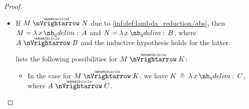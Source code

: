 \begin{proof}
\begin{itemize}
\begin{itemize}
\begin{itemize}
\begin{itemize}
          Let \( L \coloneqq Q[x \mapsto R] \). Since \( D \ppred R \), by \ref{inf:def:parallel_reduction/beta} we have
          \begin{equation*}
            N = CD \aequiv (\qabs x H) D \ppred Q[x \mapsto R] = L
          \end{equation*}
          and, since \( G \ppred R \), by  we have
          \begin{equation*}
            K \aequiv F[x \mapsto G] \ppred Q[x \mapsto R] = L.
          \end{equation*}

          So \( L \) is the desired confluence point of \( N \) and \( K \).

          \item In the case , which requires the \( \eta \)-reduction rule \ref{inf:def:parallel_reduction/eta}, \( x \) is not free in \( P \) and \( F \aequiv Px \).

          Let \( L \coloneqq PR \). Then
          \begin{equation*}
            N
            =
            CD
            \ppred
            PR
            =
            L
          \end{equation*}
          and
          \begin{equation*}
            K
            \aequiv
            F[x \mapsto G]
            \reloset {\ref{thm:substitution_on_alpha_equivalent_terms}} \aequiv
            P[x \mapsto G] \thinspace G
            \reloset {\ref{thm:lambda_substitution_noop}} =
            PG
            \ppred
            PR
            =
            L.
          \end{equation*}
        \end{itemize}
      \end{itemize}
    \end{itemize}

    \item If \( M \ppred N \) due to \ref{inf:def:lambda_reduction/abs}, then \( M = \qabs x A \) and \( N = \qabs x B \), where \( A \ppred B \) and the inductive hypothesis holds for the latter.

     lists the following possibilities for \( M \ppred K \):
    \begin{itemize}
      \item In the case  for \( M \ppred K \), we have \( K \aequiv \qabs x C \), where \( A \ppred C \).


\end{itemize}
\end{itemize}
\end{proof}
